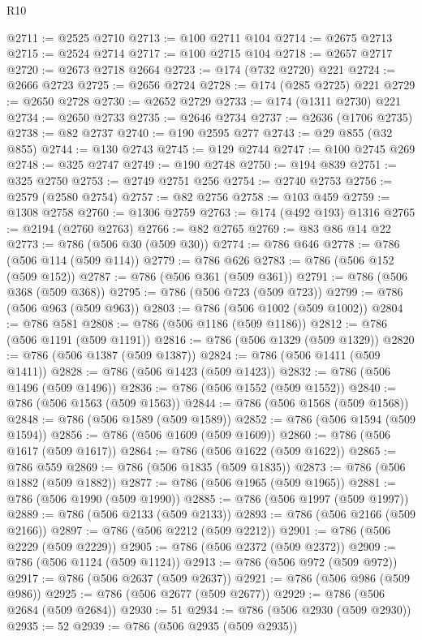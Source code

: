 \begin{lexlean}{R10}
\begin{coremodule}
@2711 := @2525 @2710
@2713 := @100 @2711 @104
@2714 := @2675 @2713
@2715 := @2524 @2714
@2717 := @100 @2715 @104
@2718 := @2657 @2717
@2720 := @2673 @2718 @2664
@2723 := @174 (@732 @2720) @221
@2724 := @2666 @2723
@2725 := @2656 @2724
@2728 := @174 (@285 @2725) @221
@2729 := @2650 @2728
@2730 := @2652 @2729
@2733 := @174 (@1311 @2730) @221
@2734 := @2650 @2733
@2735 := @2646 @2734
@2737 := @2636 (@1706 @2735)
@2738 := @82 @2737
@2740 := @190 @2595 @277
@2743 := @29 @855 (@32 @855)
@2744 := @130 @2743
@2745 := @129 @2744
@2747 := @100 @2745 @269
@2748 := @325 @2747
@2749 := @190 @2748
@2750 := @194 @839
@2751 := @325 @2750
@2753 := @2749 @2751 @256
@2754 := @2740 @2753
@2756 := @2579 (@2580 @2754)
@2757 := @82 @2756
@2758 := @103 @459
@2759 := @1308 @2758
@2760 := @1306 @2759
@2763 := @174 (@492 @193) @1316
@2765 := @2194 (@2760 @2763)
@2766 := @82 @2765
@2769 := @83 @86 @14 @22
@2773 := @786 (@506 @30 (@509 @30))
@2774 := @786 @646
@2778 := @786 (@506 @114 (@509 @114))
@2779 := @786 @626
@2783 := @786 (@506 @152 (@509 @152))
@2787 := @786 (@506 @361 (@509 @361))
@2791 := @786 (@506 @368 (@509 @368))
@2795 := @786 (@506 @723 (@509 @723))
@2799 := @786 (@506 @963 (@509 @963))
@2803 := @786 (@506 @1002 (@509 @1002))
@2804 := @786 @581
@2808 := @786 (@506 @1186 (@509 @1186))
@2812 := @786 (@506 @1191 (@509 @1191))
@2816 := @786 (@506 @1329 (@509 @1329))
@2820 := @786 (@506 @1387 (@509 @1387))
@2824 := @786 (@506 @1411 (@509 @1411))
@2828 := @786 (@506 @1423 (@509 @1423))
@2832 := @786 (@506 @1496 (@509 @1496))
@2836 := @786 (@506 @1552 (@509 @1552))
@2840 := @786 (@506 @1563 (@509 @1563))
@2844 := @786 (@506 @1568 (@509 @1568))
@2848 := @786 (@506 @1589 (@509 @1589))
@2852 := @786 (@506 @1594 (@509 @1594))
@2856 := @786 (@506 @1609 (@509 @1609))
@2860 := @786 (@506 @1617 (@509 @1617))
@2864 := @786 (@506 @1622 (@509 @1622))
@2865 := @786 @559
@2869 := @786 (@506 @1835 (@509 @1835))
@2873 := @786 (@506 @1882 (@509 @1882))
@2877 := @786 (@506 @1965 (@509 @1965))
@2881 := @786 (@506 @1990 (@509 @1990))
@2885 := @786 (@506 @1997 (@509 @1997))
@2889 := @786 (@506 @2133 (@509 @2133))
@2893 := @786 (@506 @2166 (@509 @2166))
@2897 := @786 (@506 @2212 (@509 @2212))
@2901 := @786 (@506 @2229 (@509 @2229))
@2905 := @786 (@506 @2372 (@509 @2372))
@2909 := @786 (@506 @1124 (@509 @1124))
@2913 := @786 (@506 @972 (@509 @972))
@2917 := @786 (@506 @2637 (@509 @2637))
@2921 := @786 (@506 @986 (@509 @986))
@2925 := @786 (@506 @2677 (@509 @2677))
@2929 := @786 (@506 @2684 (@509 @2684))
@2930 := 51
@2934 := @786 (@506 @2930 (@509 @2930))
@2935 := 52
@2939 := @786 (@506 @2935 (@509 @2935))

\end{coremodule}
\end{lexlean}
